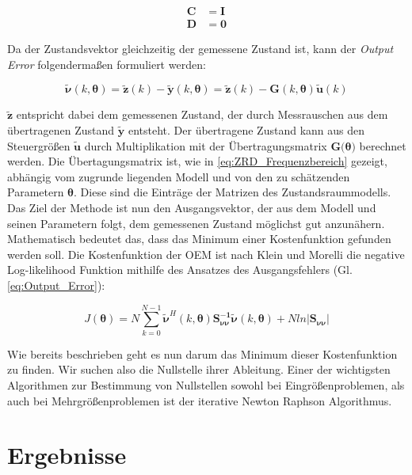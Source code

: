 \begin{align}
	\mathbf{C} &= \mathbf{I} \nonumber \\
 	\mathbf{D} &= \mathbf{0}          
	\label{eq:CD}
\end{align}

Da der Zustandsvektor gleichzeitig der gemessene Zustand ist, kann der \textit{Output Error} folgendermaßen formuliert werden:

\begin{equation}
    \mathbf{\tilde{\nu}}(k,\mathbf{\theta}) = \mathbf{\tilde{z}}(k)-\mathbf{\tilde{y}}(k,\mathbf{\theta}) = \mathbf{\tilde{z}}(k)-\mathbf{G}(k,\mathbf{\theta})\mathbf{\tilde{u}}(k)  
	\label{eq:Output_Error}
\end{equation}

$\mathbf{\tilde{z}}$ entspricht dabei dem gemessenen Zustand, der durch Messrauschen aus dem 
übertragenen Zustand 
$\mathbf{\tilde{y}}$ entsteht. Der übertragene Zustand kann aus den Steuergrößen $\mathbf{\tilde{u}}$ durch Multiplikation 
mit der Übertragungsmatrix $\mathbf{G}(\mathbf{\theta)}$ berechnet werden. Die Übertagungsmatrix ist, wie in 
\cref{eq:ZRD_Frequenzbereich} gezeigt, abhängig vom zugrunde liegenden Modell und von den zu schätzenden Parametern 
$\mathbf{\theta}$. Diese sind die Einträge der Matrizen des Zustandsraummodells. Das Ziel der Methode ist nun den Ausgangsvektor, der aus dem Modell und seinen Parametern folgt, dem gemessenen Zustand möglichst gut anzunähern. Mathematisch bedeutet das, dass das Minimum einer Kostenfunktion gefunden werden soll. Die Kostenfunktion der OEM ist nach Klein und Morelli \cite{Klein2006} die negative Log-likelihood Funktion mithilfe des Ansatzes des Ausgangsfehlers (Gl. \ref{eq:Output_Error}):

 \begin{equation}
    J(\mathbf{\theta})=N \sum\limits_{k=0}^{N-1}\mathbf{\tilde{\nu}}^H(k,\mathbf{\theta})\mathbf{S_{\nu\nu}^{-1}}\mathbf{\tilde{\nu}}(k,\mathbf{\theta})+Nln|\mathbf{S_{\nu\nu}}|
	\label{eq:Kostenfunktion}
\end{equation}  

Wie bereits beschrieben geht es nun darum das Minimum dieser Kostenfunktion zu finden. Wir suchen also die Nullstelle ihrer Ableitung. Einer der wichtigsten Algorithmen zur Bestimmung von Nullstellen sowohl bei Eingrößenproblemen, als auch bei Mehrgrößenproblemen ist der iterative Newton Raphson Algorithmus.

\section{Ergebnisse}